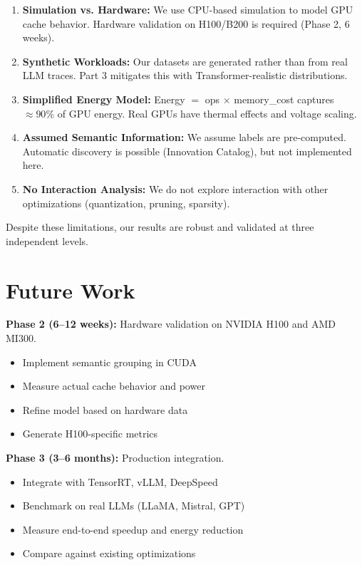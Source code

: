\documentclass[11pt,twocolumn]{article}
\begin{document}
\begin{enumerate}
\item \textbf{Simulation vs. Hardware:} We use CPU-based simulation to model GPU cache behavior. Hardware validation on H100/B200 is required (Phase 2, 6 weeks).

\item \textbf{Synthetic Workloads:} Our datasets are generated rather than from real LLM traces. Part 3 mitigates this with Transformer-realistic distributions.

\item \textbf{Simplified Energy Model:} Energy $=$ ops $\times$ memory\_cost captures $\approx 90\%$ of GPU energy. Real GPUs have thermal effects and voltage scaling.

\item \textbf{Assumed Semantic Information:} We assume labels are pre-computed. Automatic discovery is possible (Innovation Catalog), but not implemented here.

\item \textbf{No Interaction Analysis:} We do not explore interaction with other optimizations (quantization, pruning, sparsity).
\end{enumerate}

Despite these limitations, our results are robust and validated at three independent levels.

\section{Future Work}

\textbf{Phase 2 (6--12 weeks):} Hardware validation on NVIDIA H100 and AMD MI300.
\begin{itemize}
\item Implement semantic grouping in CUDA
\item Measure actual cache behavior and power
\item Refine model based on hardware data
\item Generate H100-specific metrics
\end{itemize}

\textbf{Phase 3 (3--6 months):} Production integration.
\begin{itemize}
\item Integrate with TensorRT, vLLM, DeepSpeed
\item Benchmark on real LLMs (LLaMA, Mistral, GPT)
\item Measure end-to-end speedup and energy reduction
\item Compare against existing optimizations
\end{itemize}
\end{document}
